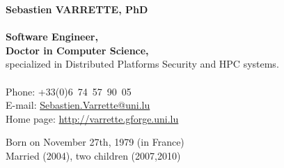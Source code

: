 \documentclass{cv}
\begin{document}
\begin{chapeau}
    \begin{adresse}
        {\Large\textbf{Sebastien VARRETTE, PhD}}\\
        \ligne\\
        \textbf{Software Engineer,}\\
        \textbf{Doctor in Computer Science,}\\
        specialized in Distributed Platforms Security and HPC systems.\\
        \ligne\\
        Phone: +33(0)6~74~57~90~05\\
        E-mail:    \url{Sebastien.Varrette@uni.lu}\\
        Home page: \url{http://varrette.gforge.uni.lu}
    \end{adresse}
    \begin{etatcivil}

        Born on November 27th, 1979 (in France)\\
        Married (2004), two children (2007,2010)\\
    \end{etatcivil}
\end{chapeau}
\end{document}
